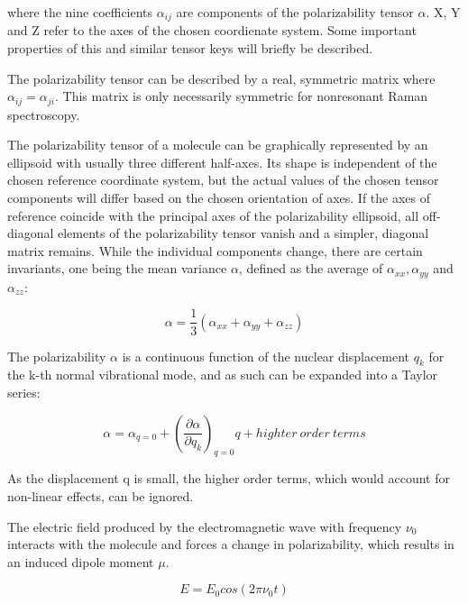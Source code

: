 where the nine coefficients \(\alpha_{ij} \) are components of the polarizability tensor \(\alpha\). X, Y and Z refer to the axes of the chosen coordienate system. Some important properties of this and similar tensor keys will briefly be described.

\bigskip

The polarizability tensor can be described by a real, symmetric matrix where \(\alpha_{ij} = \alpha_{ji}\). This matrix is only necessarily symmetric for nonresonant Raman spectroscopy. 

\bigskip

The polarizability tensor of a molecule can be graphically represented by an ellipsoid with usually three different half-axes. Its shape is independent of the chosen reference coordinate system, but the actual values of the chosen tensor components will differ based on the chosen orientation of axes. If the axes of reference coincide with the principal axes of the polarizability ellipsoid, all off-diagonal elements of the polarizability tensor vanish and a simpler,  diagonal matrix remains. While the individual components change, there are certain invariants, one being the mean variance \(\alpha\), defined as the average of \(\alpha_{xx}, \alpha_{yy} \) and \(\alpha_{zz}\):

\begin{equation}
    \alpha=\frac{1}{3}(\alpha_{xx}+\alpha_{yy}+\alpha_{zz})
\end{equation}

\bigskip


The polarizability \(\alpha\) is a continuous function of the nuclear displacement \(q_k\) for the k-th normal vibrational mode, and as such can be expanded into a Taylor series:

\begin{equation} \label{eq:polarizability}
    \alpha=\alpha_{q=0} + (\frac{\partial\alpha}{\partial q_k})_{q=0}q + highter\:order\:terms
\end{equation}



As the displacement q is small, the higher order terms, which would account for non-linear effects, can be ignored. 

\bigskip

The electric field produced by the electromagnetic wave with frequency \(\nu_0\) interacts with the molecule and forces a change in polarizability, which results in an induced dipole moment \(\mu\).

\begin{equation} \label{eq:electic_field}
    E = E_0cos(2\pi\nu_0t)
\end{equation}

